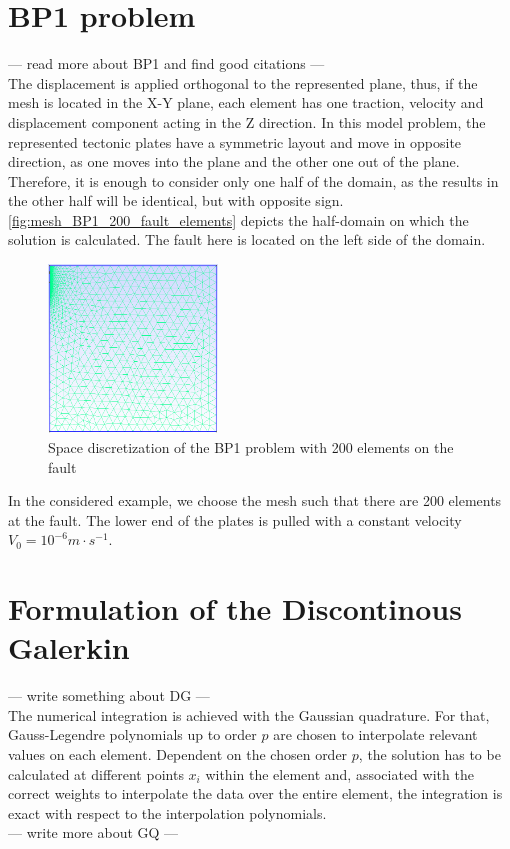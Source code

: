 \documentclass{report}
\begin{document}
\section{BP1 problem}
--- read more about BP1 and find good citations --- \\
The displacement is applied orthogonal to the represented plane, thus, if the mesh is located in the X-Y plane, each element has one traction, velocity and displacement component acting in the Z direction. In this model problem, the represented tectonic plates have a symmetric layout and move in opposite direction, as one moves into the plane and the other one out of the plane. Therefore, it is enough to consider only one half of the domain, as the results in the other half will be identical, but with opposite sign. \autoref{fig:mesh_BP1_200_fault_elements} depicts the half-domain on which the solution is calculated. The fault here is located on the left side of the domain.
\begin{figure}[H]
    \centering
    \includegraphics[width=0.4\textwidth]{images/BP1_MESH_200.png}
    \caption{Space discretization of the BP1 problem with 200 elements on the fault}
    \label{fig:mesh_BP1_200_fault_elements}
\end{figure}

In the considered example, we choose the mesh such that there are 200 elements at the fault. The lower end of the plates is pulled with a constant velocity $V_0 = 10^{-6} m\cdot s^{-1}$. 

\section{Formulation of the Discontinous Galerkin}

--- write something about DG --- \\ 


The numerical integration is achieved with the Gaussian quadrature. For that, Gauss-Legendre polynomials up to order $p$ are chosen to interpolate relevant values on each element. Dependent on the chosen order $p$, the solution has to be calculated at different points $x_i$ within the element and, associated with the correct weights to interpolate the data over the entire element, the integration is exact with respect to the interpolation polynomials. \\
--- write more about GQ --- \\
\end{document}
